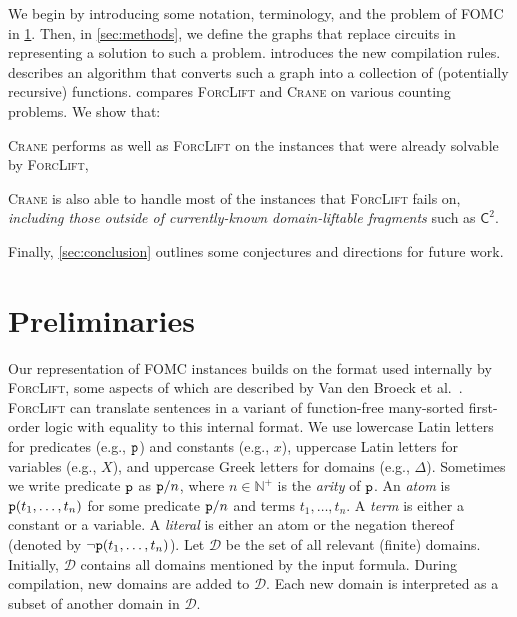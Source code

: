 \documentclass{article}
\newcommand{\Ctwo}{$\mathsf{C}^{2}$}
\newcommand{\predicate}{\texttt{\textup{p}}}
\begin{document}

We begin by introducing some notation, terminology, and the problem of FOMC in
\cref{sec:recprelims}. Then, in \cref{sec:methods}, we define the graphs that
replace circuits in representing a solution to such a problem. 
introduces the new compilation rules.  describes an
algorithm that converts such a graph into a collection of (potentially
recursive) functions.  compares \textsc{ForcLift} and
\textsc{Crane} on various counting problems. We show that:
\begin{enumerate*}[label=(\roman*)]
  \item \textsc{Crane} performs as well as \textsc{ForcLift} on the instances
  that were already solvable by \textsc{ForcLift},
  \item \textsc{Crane} is also able to handle most of the instances that
  \textsc{ForcLift} fails on, \emph{including those outside of currently-known
    domain-liftable fragments} such as \Ctwo{}.
\end{enumerate*}
Finally, \cref{sec:conclusion} outlines some conjectures and directions for
future work.

\section{Preliminaries}\label{sec:recprelims}

Our representation of FOMC instances builds on the format used internally by
\textsc{ForcLift}, some aspects of which are described by Van den Broeck et
al.~. \textsc{ForcLift} can translate
sentences in a variant of function-free many-sorted first-order logic with
equality to this internal format. We use lowercase Latin letters for predicates
(e.g., $\predicate$) and constants (e.g., $x$), uppercase Latin letters for
variables (e.g., $X$), and uppercase Greek letters for domains (e.g., $\Delta$).
Sometimes we write predicate $\predicate$ as $\predicate/n$, where
$n \in \mathbb{N}^{+}$ is the \emph{arity} of $\predicate$. An \emph{atom} is
$\predicate(t_1, \dots, t_n)$ for some predicate $\predicate/n$ and terms
$t_{1}, \dots, t_{n}$. A \emph{term} is either a constant or a variable. A
\emph{literal} is either an atom or the negation thereof (denoted by
$\neg \predicate(t_1, \dots, t_n)$). Let $\mathcal{D}$ be the set of all
relevant (finite) domains. Initially, $\mathcal{D}$ contains all domains
mentioned by the input formula. During compilation, new domains are added to
$\mathcal{D}$. Each new domain is interpreted as a subset of another domain in
$\mathcal{D}$.
\end{document}
